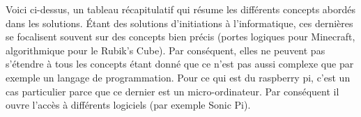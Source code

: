 \begin{table}[htb]
\begin{changemargin}{-3cm}{-3cm}
\end{changemargin}
\caption{Tableau récapitulatif des solutions de l'apport et des concepts qu'elles abordent}
\end{table}

Voici ci-dessus, un tableau récapitulatif qui résume les différents concepts abordés dans les solutions. Étant des solutions d'initiations à l'informatique, ces dernières se focalisent souvent sur des concepts bien précis (portes logiques pour Minecraft, algorithmique pour le Rubik's Cube). Par conséquent, elles ne peuvent pas s'étendre à tous les concepts étant donné que ce n'est pas aussi complexe que par exemple un langage de programmation. Pour ce qui est du raspberry pi, c'est un cas particulier parce que ce dernier est un micro-ordinateur. Par conséquent il ouvre l'accès à différents logiciels (par exemple Sonic Pi). 



\newpage